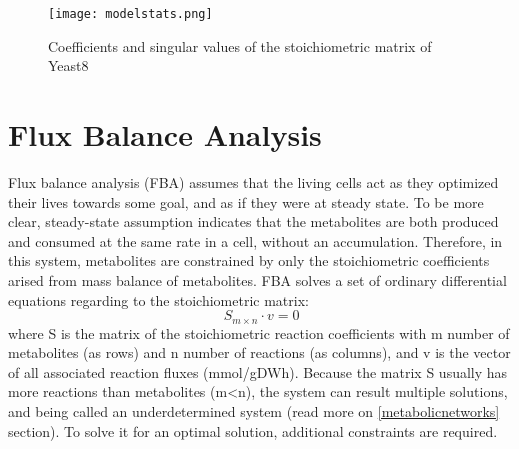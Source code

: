 \begin{figure}[H]
\begin{center}
\texttt{[image: modelstats.png]}
\end{center}
\caption[Coefficients and singular values of the stoichiometric matrix of Yeast8]{Coefficients and singular values of the stoichiometric matrix of Yeast8}
\label{fig:modelstats}
\end{figure}



\section{Flux Balance Analysis}
Flux balance analysis (FBA) assumes that the living cells act as they optimized their lives towards some goal, and as if they were at steady state. To be more clear, steady-state assumption indicates that the metabolites are both produced and consumed at the same rate in a cell, without an accumulation. Therefore, in this system, metabolites are constrained by only the stoichiometric coefficients arised from mass balance of metabolites. FBA solves a set of ordinary differential equations regarding to the stoichiometric matrix:
\begin{equation}
 \ S_{m \times n} \cdot v=0
\end{equation}
\noindent where S is the matrix of the stoichiometric reaction coefficients with m number of metabolites (as rows) and n number of reactions (as columns), and v is the vector of all associated reaction fluxes (mmol/gDWh). Because the matrix S usually has more reactions than metabolites (m<n), the system can result multiple solutions, and being called an underdetermined system (read more on \ref{metabolicnetworks} section). To solve it for an optimal solution, additional constraints are required.

